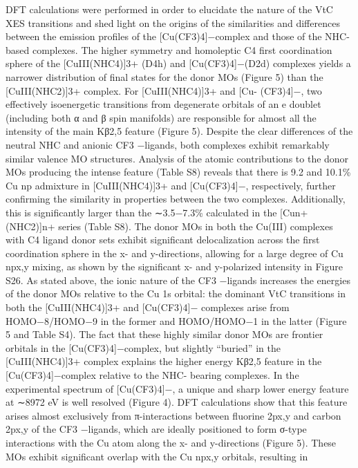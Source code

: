 \documentclass{article}
\begin{document}
\newpage


DFT calculations were performed in order to elucidate the
nature of the VtC XES transitions and shed light on the origins
of the similarities and diﬀerences between the emission proﬁles
of the [Cu(CF3)4]−complex and those of the NHC-based
complexes. The higher symmetry and homoleptic C4 ﬁrst
coordination sphere of the [CuIII(NHC4)]3+ (D4h) and
[Cu(CF3)4]−(D2d) complexes yields a narrower distribution
of ﬁnal states for the donor MOs (Figure 5) than the
[CuIII(NHC2)]3+ complex. For [CuIII(NHC4)]3+ and [Cu-
(CF3)4]−, two eﬀectively isoenergetic transitions from
degenerate orbitals of an e doublet (including both α and β
spin manifolds) are responsible for almost all the intensity of
the main Kβ2,5 feature (Figure 5). Despite the clear diﬀerences
of the neutral NHC and anionic CF3
−ligands, both complexes
exhibit remarkably similar valence MO structures. Analysis of
the atomic contributions to the donor MOs producing the
intense feature (Table S8) reveals that there is 9.2 and 10.1\%
Cu np admixture in [CuIII(NHC4)]3+ and [Cu(CF3)4]−,
respectively, further conﬁrming the similarity in properties
between the two complexes. Additionally, this is signiﬁcantly
larger than the ∼3.5−7.3\% calculated in the [Cun+(NHC2)]n+
series (Table S8).
The donor MOs in both the Cu(III) complexes with C4
ligand donor sets exhibit signiﬁcant delocalization across the
ﬁrst coordination sphere in the x- and y-directions, allowing for
a large degree of Cu npx,y mixing, as shown by the signiﬁcant x-
and y-polarized intensity in Figure S26. As stated above, the
ionic nature of the CF3
−ligands increases the energies of the
donor MOs relative to the Cu 1s orbital: the dominant VtC
transitions in both the [CuIII(NHC4)]3+ and [Cu(CF3)4]−
complexes arise from HOMO−8/HOMO−9 in the former
and HOMO/HOMO−1 in the latter (Figure 5 and Table S4).
The fact that these highly similar donor MOs are frontier
orbitals in the [Cu(CF3)4]−complex, but slightly “buried” in
the [CuIII(NHC4)]3+ complex explains the higher energy Kβ2,5
feature in the [Cu(CF3)4]−complex relative to the NHC-
bearing complexes.
In the experimental spectrum of [Cu(CF3)4]−, a unique and
sharp lower energy feature at ∼8972 eV is well resolved
(Figure 4). DFT calculations show that this feature arises
almost exclusively from π-interactions between ﬂuorine 2px,y
and carbon 2px,y of the CF3
−ligands, which are ideally
positioned to form σ-type interactions with the Cu atom along
the x- and y-directions (Figure 5). These MOs exhibit
signiﬁcant overlap with the Cu npx,y orbitals, resulting in
\end{document}
